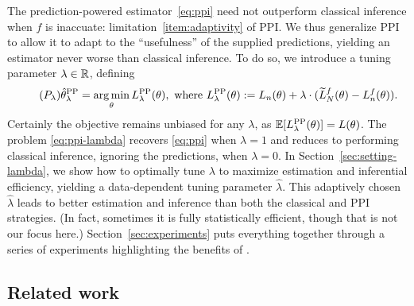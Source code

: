 The prediction-powered estimator~\eqref{eq:ppi} need not outperform classical inference when $f$ is inaccuate:
limitation~\ref{item:adaptivity} of PPI. 
We thus generalize PPI to allow it to adapt to the ``usefulness'' of the supplied predictions, yielding an estimator never worse than classical inference. 
To do so, we introduce a tuning parameter $\lambda \in \mathbb{R}$, defining
\begin{equation}
\label{eq:ppi-lambda}
\tag{$P_\lambda$}
\hat{\theta}^{\mathrm{PP}}_\lambda = \operatorname*{arg\,min}_\theta L^{\mathrm{PP}}_\lambda(\theta), \text{ where } L^{\mathrm{PP}}_\lambda(\theta):= L_n(\theta) + \lambda \cdot (\widetilde L^f_N(\theta) - L_n^f(\theta)).
\end{equation}
Certainly the objective remains unbiased for any $\lambda$, as
$\mathbb{E}[L^{\mathrm{PP}}_\lambda(\theta)] = L(\theta)$. The problem \eqref{eq:ppi-lambda}
recovers \eqref{eq:ppi} when $\lambda = 1$ and reduces to performing
classical inference, ignoring the predictions, when
$\lambda=0$. 
In Section~\ref{sec:setting-lambda}, we show how to optimally tune $\lambda$ to maximize estimation and inferential efficiency, yielding a data-dependent tuning parameter $\hat{\lambda}$.
This adaptively chosen $\hat{\lambda}$ leads to better estimation and inference than both the classical and PPI strategies.
(In fact, sometimes it is fully statistically efficient, though that is
not our focus here.)
Section~\ref{sec:experiments} puts everything together through a series of experiments highlighting the benefits of \ppipp.


\subsection{Related work}

